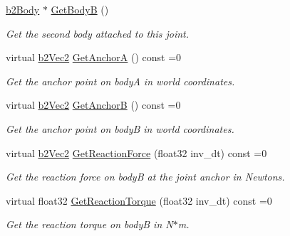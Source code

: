 \begin{DoxyCompactItemize}
\mbox{\label{classb2Joint_ab421eab3dc0a196653fb105dbd9212e1}} 
\hyperlink{classb2Body}{b2\+Body} $\ast$ \hyperlink{classb2Joint_ab421eab3dc0a196653fb105dbd9212e1}{Get\+BodyB} ()
\begin{DoxyCompactList}\small\item\em Get the second body attached to this joint. \end{DoxyCompactList}\item 
\mbox{\label{classb2Joint_abe46ca3aad5db73909a9b5a7b2117447}} 
virtual \hyperlink{structb2Vec2}{b2\+Vec2} \hyperlink{classb2Joint_abe46ca3aad5db73909a9b5a7b2117447}{Get\+AnchorA} () const =0
\begin{DoxyCompactList}\small\item\em Get the anchor point on bodyA in world coordinates. \end{DoxyCompactList}\item 
\mbox{\label{classb2Joint_a88e947c65d4ea26fe539f02a8cb7f7a9}} 
virtual \hyperlink{structb2Vec2}{b2\+Vec2} \hyperlink{classb2Joint_a88e947c65d4ea26fe539f02a8cb7f7a9}{Get\+AnchorB} () const =0
\begin{DoxyCompactList}\small\item\em Get the anchor point on bodyB in world coordinates. \end{DoxyCompactList}\item 
\mbox{\label{classb2Joint_a7e0eddefb9b69ad050b8ef6425838a74}} 
virtual \hyperlink{structb2Vec2}{b2\+Vec2} \hyperlink{classb2Joint_a7e0eddefb9b69ad050b8ef6425838a74}{Get\+Reaction\+Force} (float32 inv\+\_\+dt) const =0
\begin{DoxyCompactList}\small\item\em Get the reaction force on bodyB at the joint anchor in Newtons. \end{DoxyCompactList}\item 
\mbox{\label{classb2Joint_ae355e441c2aa842777dc04e24f15ced0}} 
virtual float32 \hyperlink{classb2Joint_ae355e441c2aa842777dc04e24f15ced0}{Get\+Reaction\+Torque} (float32 inv\+\_\+dt) const =0
\begin{DoxyCompactList}\small\item\em Get the reaction torque on bodyB in N$\ast$m. \end{DoxyCompactList}\item 

\end{DoxyCompactItemize}
